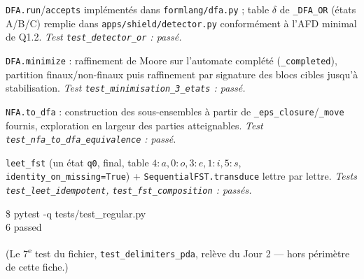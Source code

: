 \documentclass[11pt,a4paper]{scrartcl}
\begin{document}
\begin{description}[leftmargin=1.6em,style=nextline]
  \item[E1.1] \texttt{DFA.run}/\texttt{accepts} implémentés dans
    \texttt{formlang/dfa.py} ; table $\delta$ de \texttt{\_DFA\_OR} (états A/B/C)
    remplie dans \texttt{apps/shield/detector.py} conformément à l'AFD minimal de
    Q1.2. \emph{Test \texttt{test\_detector\_or} : passé.}
  \item[E1.2] \texttt{DFA.minimize} : raffinement de Moore sur l'automate complété
    (\texttt{\_completed}), partition finaux/non-finaux puis raffinement par
    signature des blocs cibles jusqu'à stabilisation. \emph{Test
    \texttt{test\_minimisation\_3\_etats} : passé.}
  \item[E1.3] \texttt{NFA.to\_dfa} : construction des sous-ensembles à partir de
    \texttt{\_eps\_closure}/\texttt{\_move} fournis, exploration en largeur des
    parties atteignables. \emph{Test \texttt{test\_nfa\_to\_dfa\_equivalence} :
    passé.}
  \item[E1.4] \texttt{leet\_fst} (un état \texttt{q0}, final, table $4\!:\!a,
    0\!:\!o, 3\!:\!e, 1\!:\!i, 5\!:\!s$, \texttt{identity\_on\_missing=True}) +
    \texttt{SequentialFST.transduce} lettre par lettre. \emph{Tests
    \texttt{test\_leet\_idempotent}, \texttt{test\_fst\_composition} : passés.}
\end{description}

\begin{exemple}
\ttfamily \$ pytest -q tests/test\_regular.py\\ 6 passed
\end{exemple}
\noindent (Le 7\textsuperscript{e} test du fichier, \texttt{test\_delimiters\_pda},
relève du Jour 2 — hors périmètre de cette fiche.)
\end{document}
